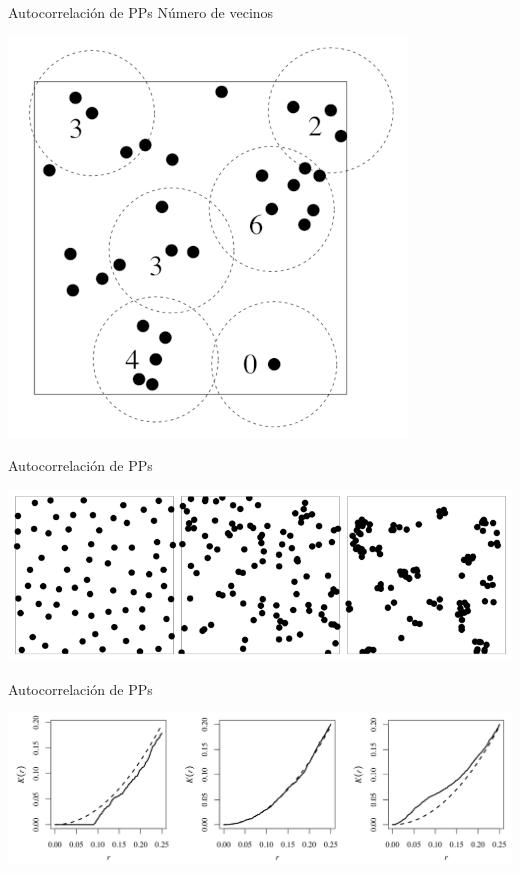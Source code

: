 \documentclass[
  11pt,
  ignorenonframetext,
]{beamer}
\begin{document}
\begin{frame}{Autocorrelación de PPs}
\protect\hypertarget{autocorrelaciuxf3n-de-pps}{}
Número de vecinos

\begin{center}\includegraphics{Figuras/Cuenta-vecinos} \end{center}
\end{frame}

\begin{frame}{Autocorrelación de PPs}
\protect\hypertarget{autocorrelaciuxf3n-de-pps-1}{}
\begin{center}\includegraphics{Figuras/Ejemplo-procesos} \end{center}
\end{frame}

\begin{frame}{Autocorrelación de PPs}
\protect\hypertarget{autocorrelaciuxf3n-de-pps-2}{}
\begin{center}\includegraphics{Figuras/K-Ripley} \end{center}
\end{frame}
\end{document}
